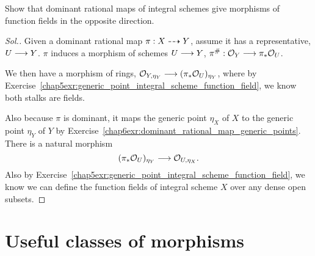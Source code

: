 \documentclass[11pt]{book} %
\begin{document}
\begin{exr}
Show that dominant rational maps of integral schemes give morphisms of function fields in the opposite direction.
\end{exr}
\begin{proof}[Sol.]
Given a dominant rational map $\pi:X\dashrightarrow Y$, assume it has a representative, $U\longrightarrow Y$. $\pi$ induces a morphism of schemes $U\longrightarrow Y$, $\pi^\#:{\cal O}_Y\longrightarrow \pi_*{\cal O}_U$.

We then have a morphism of rings, ${\cal O}_{Y,\eta_Y}\longrightarrow (\pi_*{\cal O}_{U})_{\eta_Y}$, where by Exercise~\ref{chap5exr:generic_point_integral_scheme_function_field}, we know both stalks are fields.

Also because $\pi$ is dominant, it maps the generic point $\eta_X$ of $X$ to the generic point $\eta_Y$ of $Y$ by Exercise~\ref{chap6exr:dominant_rational_map_generic_points}. There is a natural morphism
$$
(\pi_*{\cal O}_{U})_{\eta_Y}\longrightarrow{\cal O}_{U,\eta_X}.
$$
Also by Exercise~\ref{chap5exr:generic_point_integral_scheme_function_field}, we know we can define the function fields of integral scheme $X$ over any dense open subsets.
\end{proof}
\chapter{Useful classes of morphisms}
\end{document}
